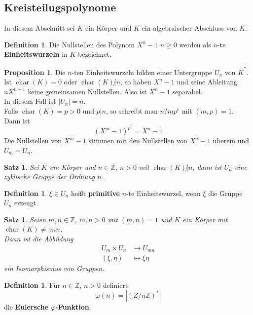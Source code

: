 \documentclass[10pt,a4paper]{article}
\newcommand{\Z}{\ensuremath{\mathbb{Z}}}
\newcommand{\ol}[1]{\overline{#1}}
\newcommand{\abs}[1]{\left|#1\right|}
\newcommand{\cha}{\operatorname{char}}
\theoremstyle{plain}
\newtheorem{satz}[theorem]{Satz}
\theoremstyle{definition}
\newtheorem{definition}[theorem]{Definition}
\newtheorem{prop}[theorem]{Proposition}
\theoremstyle{remark}
\begin{document}
	\subsection{Kreisteilugspolynome}
	In diesem Abschnitt sei $K$ ein Körper und $\ol K$ ein algebraischer Abschluss von $K$.
	\begin{definition}
		Die Nullstellen des Polynom $X^n-1$ $n\geq 0$ werden als $n$-te \textbf{Einheitswurzeln} in $\ol K$ bezeichnet.\\
	\end{definition}
	\begin{prop}
		Die $n$-ten Einheitswurzeln bilden einer Untergruppe $U_n$ von $\ol K^*$.\\
		Ist $\cha(K)=0$ oder $\cha(K)\not|n$, so haben $X^n-1$ und seine Ableitung $nX^{n-1}$ keine gemeinsamen Nullstellen. Also ist $X^n-1$ separabel.\\
		In diesem Fall ist $\abs{U_n}=n$.\\
		Falls $\cha(K)=p>0$ und $p|n$, so schreibt man $n?mp^r$ mit $(m,p)=1$.\\
		Dann ist
		\[(X^m-1)^{p^r}=X^n-1\]
		Die Nullstellen von $X^m-1$ stimmen mit den Nullstellen von $X^n-1$ überein und $U_m=U_n$.\\
	\end{prop}

	\begin{satz}
		Sei $K$ ein Körper und $n\in\Z$, $n>0$ mit $\cha(K)\not|n$, dann ist $U_n$ eine zyklische Gruppe der Ordnung $n$.
	\end{satz}

	\begin{definition}
		$\xi\in U_n$ heißt \textbf{primitive} $n$-te Einheitswurzel, wenn $\xi$ die Gruppe $U_n$ erzeugt. 
	\end{definition}

	\begin{satz}
		Seien $m,n\in\Z$, $m,n>0$ mit $(m,n)=1$ und $K$ ein Körper mit $\cha(K)\neq| mn$.\\
		Dann ist die Abbildung
		\begin{align*}
		U_m\times U_n&\to U_{mn}\\
		(\xi,\eta)&\mapsto\xi\eta
		\end{align*}
		ein Isomorphismus  von Gruppen.
	\end{satz}

	\begin{definition}
		Für $n\in\Z$, $n>0$ definiert
		\[\varphi(n)=\abs{(Z/n\Z)^*}\]
		die \textbf{Eulersche $\varphi$-Funktion}.
	\end{definition}
\end{document}
